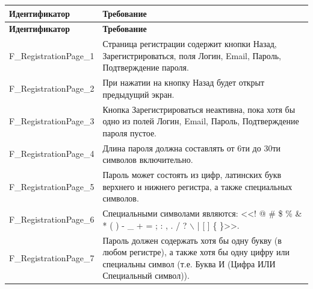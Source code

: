 \documentclass[a4paper, 14pt]{article}
\begin{document}
\begin{longtable}{| p{} | p{} |}
    \hline
    \textbf{Идентификатор}          & \textbf{Требование}                                                                                                                                                                \\
    \hline
    \endfirsthead
    \hline
    \textbf{Идентификатор}          & \textbf{Требование}                                                                                                                                                                \\
    \hline
    \endhead

    F\_RegistrationPage\_1          & Страница регистрации содержит кнопки Назад, Зарегистрироваться, поля Логин, Email, Пароль, Подтверждение пароля.                                                                   \\ \hline
    F\_RegistrationPage\_2          & При нажатии на кнопку Назад будет открыт предыдущий экран.                                                                                                                         \\ \hline
    F\_RegistrationPage\_3          & Кнопка Зарегистрироваться неактивна, пока хотя бы одно из полей Логин, Email, Пароль, Подтверждение пароля пустое.                                                                 \\ \hline
    F\_RegistrationPage\_4          & Длина пароля должна составлять от 6ти до 30ти символов включительно.                                                                                                               \\ \hline
    F\_RegistrationPage\_5          & Пароль может состоять из цифр, латинских букв верхнего и нижнего регистра, а также специальных символов.                                                                           \\ \hline
    F\_RegistrationPage\_6          & Специальными символами являются: <<! @ \# \$ \% \& * ( ) - \_ + = ; : , . / ? $\backslash$ | [ ] \{ \}>>.                                                                          \\ \hline
    F\_RegistrationPage\_7          & Пароль должен содержать хотя бы одну букву (в любом регистре), а также хотя бы одну цифру или специальны символ (т.е. Буква И (Цифра ИЛИ Специальный символ)).                     \\ \hline

\end{longtable}
\end{document}
